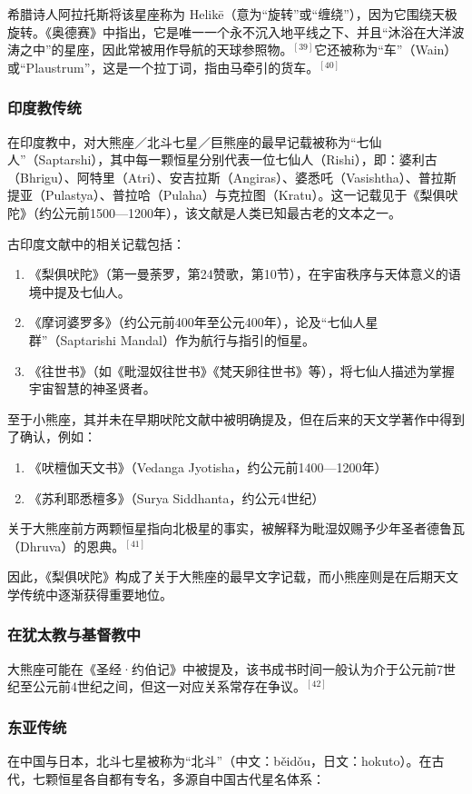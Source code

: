 希腊诗人阿拉托斯将该星座称为 Helikē（意为“旋转”或“缠绕”），因为它围绕天极旋转。《奥德赛》中指出，它是唯一一个永不沉入地平线之下、并且“沐浴在大洋波涛之中”的星座，因此常被用作导航的天球参照物。$^{[39]}$它还被称为“车”（Wain）或“Plaustrum”，这是一个拉丁词，指由马牵引的货车。$^{[40]}$
\subsubsection{印度教传统}  
在印度教中，对大熊座／北斗七星／巨熊座的最早记载被称为“七仙人”（Saptarshi），其中每一颗恒星分别代表一位七仙人（Rishi），即：婆利古（Bhrigu）、阿特里（Atri）、安吉拉斯（Angiras）、婆悉吒（Vasishtha）、普拉斯提亚（Pulastya）、普拉哈（Pulaha）与克拉图（Kratu）。这一记载见于《梨俱吠陀》（约公元前1500—1200年），该文献是人类已知最古老的文本之一。

古印度文献中的相关记载包括：
\begin{enumerate}
\item 《梨俱吠陀》（第一曼荼罗，第24赞歌，第10节），在宇宙秩序与天体意义的语境中提及七仙人。
\item 《摩诃婆罗多》（约公元前400年至公元400年），论及“七仙人星群”（Saptarishi Mandal）作为航行与指引的恒星。
\item 《往世书》（如《毗湿奴往世书》《梵天卵往世书》等），将七仙人描述为掌握宇宙智慧的神圣贤者。
\end{enumerate}
至于小熊座，其并未在早期吠陀文献中被明确提及，但在后来的天文学著作中得到了确认，例如：
\begin{enumerate}
\item 《吠檀伽天文书》（Vedanga Jyotisha，约公元前1400—1200年）
\item 《苏利耶悉檀多》（Surya Siddhanta，约公元4世纪）
\end{enumerate}
关于大熊座前方两颗恒星指向北极星的事实，被解释为毗湿奴赐予少年圣者德鲁瓦（Dhruva）的恩典。$^{[41]}$

因此，《梨俱吠陀》构成了关于大熊座的最早文字记载，而小熊座则是在后期天文学传统中逐渐获得重要地位。
\subsubsection{在犹太教与基督教中}  
大熊座可能在《圣经·约伯记》中被提及，该书成书时间一般认为介于公元前7世纪至公元前4世纪之间，但这一对应关系常存在争议。$^{[42]}$
\subsubsection{东亚传统}  
在中国与日本，北斗七星被称为“北斗”（中文：běidǒu，日文：hokuto）。在古代，七颗恒星各自都有专名，多源自中国古代星名体系：

